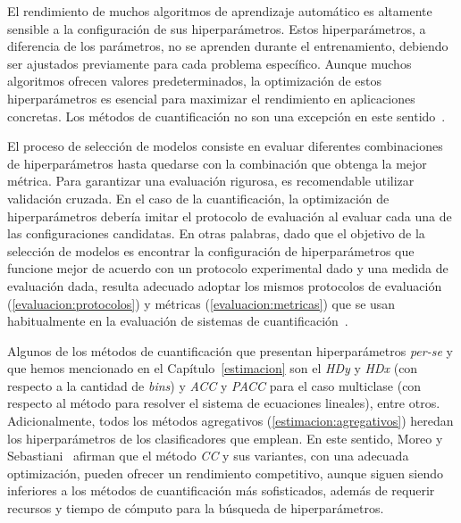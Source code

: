 El rendimiento de muchos algoritmos de aprendizaje automático es altamente
sensible a la configuración de sus hiperparámetros. Estos hiperparámetros, a
diferencia de los parámetros, no se aprenden durante el entrenamiento, debiendo
ser ajustados previamente para cada problema específico. Aunque muchos
algoritmos ofrecen valores predeterminados, la optimización de estos
hiperparámetros es esencial para maximizar el rendimiento en aplicaciones
concretas. Los métodos de cuantificación no son una excepción en este
sentido~\cite{esuli2023learning}.

El proceso de selección de modelos consiste en evaluar diferentes combinaciones
de hiperparámetros hasta quedarse con la combinación que obtenga la mejor
métrica. Para garantizar una evaluación rigurosa, es recomendable utilizar
validación cruzada. En el caso de la cuantificación, la optimización de
hiperparámetros debería imitar el protocolo de evaluación al evaluar cada una de
las configuraciones candidatas. En otras palabras, dado que el objetivo de la
selección de modelos es encontrar la configuración de hiperparámetros que
funcione mejor de acuerdo con un protocolo experimental dado y una medida de
evaluación dada, resulta adecuado adoptar los mismos protocolos de evaluación
(\ref{evaluacion:protocolos}) y métricas (\ref{evaluacion:metricas}) que se usan
habitualmente en la evaluación de sistemas de
cuantificación~\cite{moreo2022tweet, hassan2021pitfalls}.

Algunos de los métodos de cuantificación que presentan hiperparámetros {\it
per-se\/} y que hemos mencionado en el Capítulo~\ref{estimacion} son el {\it
HDy\/} y {\it HDx\/} (con respecto a la cantidad de {\it bins}) y {\it ACC\/} y
{\it PACC\/} para el caso multiclase (con respecto al método para resolver el
sistema de ecuaciones lineales), entre otros. Adicionalmente, todos los métodos
agregativos (\ref{estimacion:agregativos}) heredan los hiperparámetros de los
clasificadores que emplean. En este sentido, Moreo y
Sebastiani~\cite{moreo2021re} afirman que el método {\it CC\/} y sus variantes,
con una adecuada optimización, pueden ofrecer un rendimiento competitivo, aunque
siguen siendo inferiores a los métodos de cuantificación más sofisticados,
además de requerir recursos y tiempo de cómputo para la búsqueda de
hiperparámetros.
